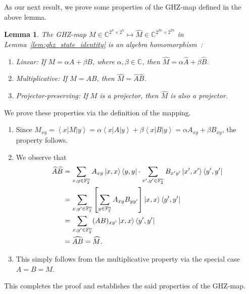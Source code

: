 \documentclass[journal,onecolumn]{IEEEtran}
\newtheorem{lemma}[theorem]{Lemma}
\newcommand{\ghzmap}[1]{\widehat{#1}}
\newcommand{\dket}[1]{\left\lvert #1 \right\rangle}
\newcommand{\dbra}[1]{\left\langle #1 \right\rvert}
\begin{document}
As our next result, we prove some properties of the GHZ-map defined in the above lemma.

\begin{lemma}
The GHZ-map $M \in \mathbb{C}^{2^n \times 2^n} \mapsto \ghzmap{M} \in \mathbb{C}^{2^{2n} \times 2^{2n}}$ in Lemma~\ref{lem:ghz_state_identity} is an algebra homomorphism~\cite{Dummit-2004}: %
\begin{enumerate}

\item[(a)] Linear: If $M = \alpha A + \beta B$, where $\alpha, \beta \in \mathbb{C}$, then $\ghzmap{M} = \alpha \ghzmap{A} + \beta \ghzmap{B}$.

\item[(b)] Multiplicative: If $M = A B$, then $\ghzmap{M} = \ghzmap{A} \ghzmap{B}$.

\item[(c)] Projector-preserving: If $M$ is a projector, then $\ghzmap{M}$ is also a projector.

\end{enumerate}
\end{lemma}
\begin{IEEEproof}
We prove these properties via the definition of the mapping.
\begin{enumerate}
    
\item[(a)] Since $M_{xy} = \dbra{x} M \dket{y} = \alpha \dbra{x} A \dket{y} + \beta \dbra{x} B \dket{y} = \alpha A_{xy} + \beta B_{xy}$, the property follows.

\item[(b)] We observe that
\begin{align}
\ghzmap{A} \ghzmap{B} & = \sum_{x,y \in \mathbb{F}_2^n} A_{xy} \dketbra{x,x}{y,y} \cdot \sum_{x',y' \in \mathbb{F}_2^n} B_{x'y'} \dketbra{x',x'}{y',y'} \\
%
  & = \sum_{x,y' \in \mathbb{F}_2^n} \left[ \sum_{y \in \mathbb{F}_2^n} A_{xy} B_{yy'} \right] \dketbra{x,x}{y',y'} \\
%
  & = \sum_{x,y' \in \mathbb{F}_2^n} (AB)_{xy'} \dketbra{x,x}{y',y'} \\
%
  & = \ghzmap{AB} = \ghzmap{M}.
\end{align}

\item[(c)] This simply follows from the multiplicative property via the special case $A = B = M$.
    
\end{enumerate}
This completes the proof and establishes the said properties of the GHZ-map.
\end{IEEEproof}
\end{document}
